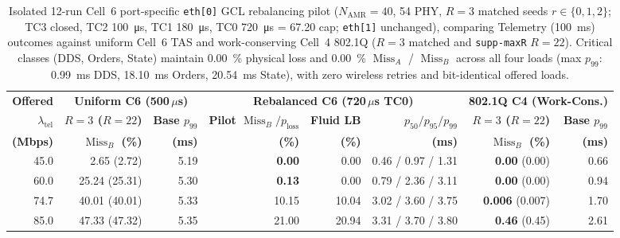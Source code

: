 \documentclass[11pt,a4paper]{article}
\newcommand{\Namr}{\ensuremath{N_{\mathrm{AMR}}}}
\newcommand{\ltel}{\ensuremath{\lambda_{\mathrm{tel}}}}
\newcommand{\MissA}{\ensuremath{\operatorname{Miss}_A}}
\newcommand{\MissB}{\ensuremath{\operatorname{Miss}_B}}
\newcommand{\ploss}{\ensuremath{p_{\mathrm{loss}}}}
\begin{document}
\begin{table}[!tbp]
\centering
\scriptsize
\setlength{\tabcolsep}{1.8pt}
\caption{Isolated 12-run Cell~6 port-specific \texttt{eth[0]} GCL rebalancing pilot ($\Namr=40$, \qty{54}{\mbps} PHY, $R=3$ matched seeds $r \in \{0,1,2\}$; TC3 closed, TC2 \qty{100}{\micro\second}, TC1 \qty{180}{\micro\second}, TC0 \qty{720}{\micro\second} = \qty{67.20}{\mbps} cap; \texttt{eth[1]} unchanged), comparing Telemetry (\qty{100}{\milli\second}) outcomes against uniform Cell~6 TAS and work-conserving Cell~4 802.1Q ($R=3$ matched and \texttt{supp-maxR} $R=22$). Critical classes (DDS, Orders, State) maintain \qty{0.00}{\percent} physical loss and \qty{0.00}{\percent} $\MissA$ / $\MissB$ across all four loads (max $p_{99}$: \qty{0.99}{\milli\second} DDS, \qty{18.10}{\milli\second} Orders, \qty{20.54}{\milli\second} State), with zero wireless retries and bit-identical offered loads.}
\label{tab:gcl_pilot}
\begin{tabular}{@{}r r r r r r r r@{}}
\toprule
\textbf{Offered} & \multicolumn{2}{c}{\textbf{Uniform C6 (500\,$\mu$s)}} & \multicolumn{3}{c}{\textbf{Rebalanced C6 (720\,$\mu$s TC0)}} & \multicolumn{2}{c}{\textbf{802.1Q C4 (Work-Cons.)}} \\
\cmidrule(lr){2-3} \cmidrule(lr){4-6} \cmidrule(lr){7-8}
\textbf{$\ltel$} & \textbf{$R{=}3$ ($R{=}22$)} & \textbf{Base $p_{99}$} & \textbf{Pilot $\MissB/\ploss$} & \textbf{Fluid LB} & \textbf{$p_{50}/p_{95}/p_{99}$} & \textbf{$R{=}3$ ($R{=}22$)} & \textbf{Base $p_{99}$} \\
\textbf{(Mbps)} & \textbf{$\MissB$ (\%)} & \textbf{(ms)} & \textbf{(\%)} & \textbf{(\%)} & \textbf{(ms)} & \textbf{$\MissB$ (\%)} & \textbf{(ms)} \\
\midrule
45.0 & 2.65 (2.72) & 5.19 & \textbf{0.00} & 0.00 & 0.46 / 0.97 / 1.31 & \textbf{0.00} (0.00) & 0.66 \\
60.0 & 25.24 (25.31) & 5.30 & \textbf{0.13} & 0.00 & 0.79 / 2.36 / 3.11 & \textbf{0.00} (0.00) & 0.94 \\
74.7 & 40.01 (40.01) & 5.33 & 10.15 & 10.04 & 3.02 / 3.60 / 3.75 & \textbf{0.006} (0.007) & 1.70 \\
85.0 & 47.33 (47.32) & 5.35 & 21.00 & 20.94 & 3.31 / 3.70 / 3.80 & \textbf{0.46} (0.45) & 2.61 \\
\bottomrule
\end{tabular}
\end{table}
\end{document}
